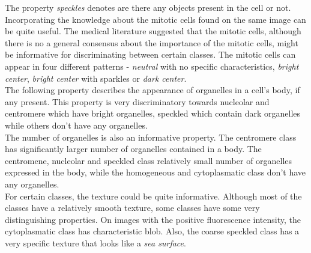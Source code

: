 The property \textit{speckles} denotes are there any objects present in the cell or not. \\

Incorporating the knowledge about the mitotic cells found on the same image can be quite useful. The medical literature suggested that the mitotic cells, although there is no a general consensus about the importance of the mitotic cells, might be informative for discriminating between certain classes. The mitotic cells can appear in four different patterns - \textit{neutral} with no specific characteristics, \textit{bright center},  \textit{bright center} with sparkles or \textit{dark center}. \\

The following property describes the appearance of organelles in a cell's body, if any present. This property is very discriminatory towards nucleolar and centromere which have bright organelles, speckled which contain dark organelles while others don't have any organelles. \\

The number of organelles is also an informative property. The centromere class has significantly larger number of organelles contained in a body. The centromene, nucleolar and speckled class relatively small number of organelles expressed in the body, while the homogeneous and cytoplasmatic class don't have any organelles. \\

For certain classes, the texture could be quite informative. Although most of the classes have a relatively smooth texture, some classes have some very distinguishing properties. On images with the positive fluorescence intensity, the cytoplasmatic class has characteristic blob. Also, the coarse speckled class has a very specific texture that looks like a \textit{sea surface}. \\



